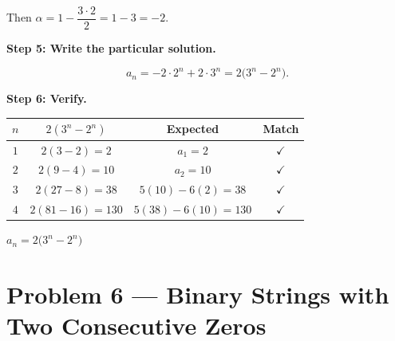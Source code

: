 \documentclass[12pt, a4paper]{article}
\begin{document}
Then $\alpha = 1 - \dfrac{3 \cdot 2}{2} = 1 - 3 = -2$.

\textbf{Step 5: Write the particular solution.}

\[
  a_n = -2 \cdot 2^n + 2 \cdot 3^n = \boxed{2\bigl(3^n - 2^n\bigr)}.
\]

\textbf{Step 6: Verify.}

\begin{center}
\renewcommand{\arraystretch}{1.3}
\begin{tabular}{cccc}
\toprule
$n$ & $2(3^n - 2^n)$ & Expected & Match \\
\midrule
$1$ & $2(3 - 2) = 2$ & $a_1 = 2$ & $\checkmark$ \\
$2$ & $2(9 - 4) = 10$ & $a_2 = 10$ & $\checkmark$ \\
$3$ & $2(27 - 8) = 38$ & $5(10) - 6(2) = 38$ & $\checkmark$ \\
$4$ & $2(81 - 16) = 130$ & $5(38) - 6(10) = 130$ & $\checkmark$ \\
\bottomrule
\end{tabular}
\end{center}

\begin{answerbox}
\centering
$a_n = 2\bigl(3^n - 2^n\bigr)$
\end{answerbox}

\newpage
\section{Problem 6 --- Binary Strings with Two Consecutive Zeros}
\end{document}
